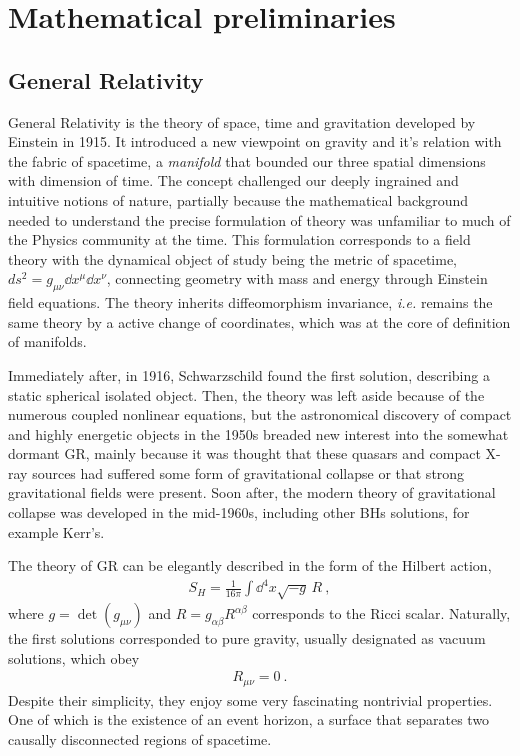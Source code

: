 
\chapter{Mathematical preliminaries} %
\label{Chapter2}


\section{General Relativity}

General Relativity is the theory of space, time and gravitation developed by Einstein in 1915. 
It introduced a new viewpoint on gravity and it's relation with the fabric of spacetime, a \emph{manifold} that bounded our three spatial dimensions with dimension of time.
The concept challenged our deeply ingrained and intuitive notions of nature, partially because the mathematical background needed to understand the precise formulation of theory was unfamiliar to much of the Physics community at the time.
This formulation corresponds to a field theory with the dynamical object of study being the metric of spacetime, $ds^2=g_{\mu\nu} \dd x^\mu \dd x^\nu$, connecting geometry with mass and energy through Einstein field equations.
The theory inherits diffeomorphism invariance, \emph{i.e.} remains the same theory by a active change of coordinates, which was at the core of definition of manifolds.

Immediately after, in 1916, Schwarzschild found the first solution, describing a static spherical isolated object.
Then, the theory was left aside because of the numerous coupled nonlinear equations, but the astronomical discovery of compact and highly energetic objects in the 1950s breaded new interest into the somewhat dormant GR, mainly because it was thought that these quasars and compact X-ray sources had suffered some form of gravitational collapse or that strong gravitational fields were present.
Soon after, the modern theory of gravitational collapse was developed in the mid-1960s, including other BHs solutions, for example Kerr's.

The theory of GR can be elegantly described in the form of the Hilbert action,
\begin{align}
    S_{H} = \frac{1}{16\pi} \int \dd^4 x \sqrt{-g} \,R ~,
    \label{eq2:actionGR}
\end{align}
where $g=\det(g_{\mu\nu})$ and $R=g_{\alpha\beta} R^{\alpha\beta}$ corresponds to the Ricci scalar.
Naturally, the first solutions corresponded to pure gravity, usually designated as vacuum solutions, which obey
\begin{align}
    R_{\mu\nu} = 0 ~.
    \label{eq2:vacuumGR}
\end{align}
Despite their simplicity, they enjoy some very fascinating nontrivial properties. 
One of which is the existence of an event horizon, a surface that separates two causally disconnected regions of spacetime.

